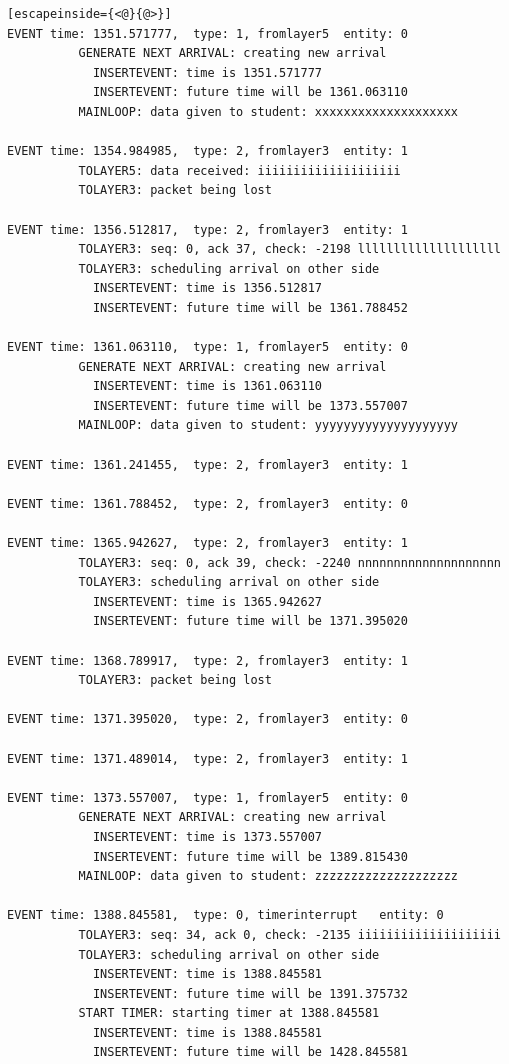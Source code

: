 \documentclass[paper=a4, fontsize=11pt]{scrartcl}
\numberwithin{equation}{section}		%
\numberwithin{figure}{section}			%
\numberwithin{table}{section}				%
\begin{document}
\begin{lstlisting}[escapeinside={<@}{@>}]
EVENT time: 1351.571777,  type: 1, fromlayer5  entity: 0
          GENERATE NEXT ARRIVAL: creating new arrival
            INSERTEVENT: time is 1351.571777
            INSERTEVENT: future time will be 1361.063110
          MAINLOOP: data given to student: xxxxxxxxxxxxxxxxxxxx

EVENT time: 1354.984985,  type: 2, fromlayer3  entity: 1
          TOLAYER5: data received: iiiiiiiiiiiiiiiiiiii
          TOLAYER3: packet being lost

EVENT time: 1356.512817,  type: 2, fromlayer3  entity: 1
          TOLAYER3: seq: 0, ack 37, check: -2198 llllllllllllllllllll
          TOLAYER3: scheduling arrival on other side
            INSERTEVENT: time is 1356.512817
            INSERTEVENT: future time will be 1361.788452

EVENT time: 1361.063110,  type: 1, fromlayer5  entity: 0
          GENERATE NEXT ARRIVAL: creating new arrival
            INSERTEVENT: time is 1361.063110
            INSERTEVENT: future time will be 1373.557007
          MAINLOOP: data given to student: yyyyyyyyyyyyyyyyyyyy

EVENT time: 1361.241455,  type: 2, fromlayer3  entity: 1

EVENT time: 1361.788452,  type: 2, fromlayer3  entity: 0

EVENT time: 1365.942627,  type: 2, fromlayer3  entity: 1
          TOLAYER3: seq: 0, ack 39, check: -2240 nnnnnnnnnnnnnnnnnnnn
          TOLAYER3: scheduling arrival on other side
            INSERTEVENT: time is 1365.942627
            INSERTEVENT: future time will be 1371.395020

EVENT time: 1368.789917,  type: 2, fromlayer3  entity: 1
          TOLAYER3: packet being lost

EVENT time: 1371.395020,  type: 2, fromlayer3  entity: 0

EVENT time: 1371.489014,  type: 2, fromlayer3  entity: 1

EVENT time: 1373.557007,  type: 1, fromlayer5  entity: 0
          GENERATE NEXT ARRIVAL: creating new arrival
            INSERTEVENT: time is 1373.557007
            INSERTEVENT: future time will be 1389.815430
          MAINLOOP: data given to student: zzzzzzzzzzzzzzzzzzzz

EVENT time: 1388.845581,  type: 0, timerinterrupt   entity: 0
          TOLAYER3: seq: 34, ack 0, check: -2135 iiiiiiiiiiiiiiiiiiii
          TOLAYER3: scheduling arrival on other side
            INSERTEVENT: time is 1388.845581
            INSERTEVENT: future time will be 1391.375732
          START TIMER: starting timer at 1388.845581
            INSERTEVENT: time is 1388.845581
            INSERTEVENT: future time will be 1428.845581


\end{lstlisting}
\end{document}

